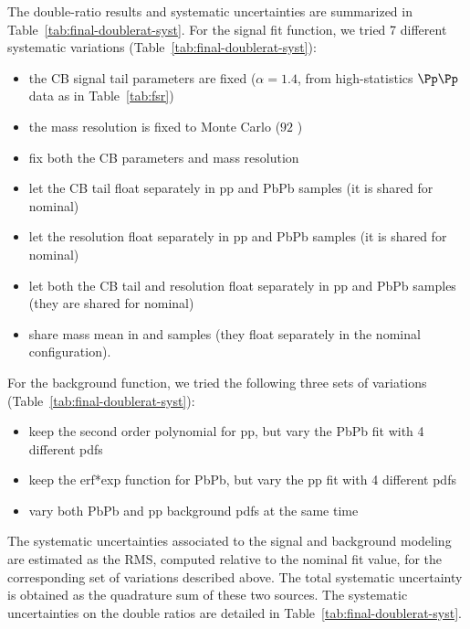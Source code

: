 The double-ratio results and systematic uncertainties are summarized in Table~\ref{tab:final-doublerat-syst}.
For the signal fit function, we tried 7 different systematic variations (Table~\ref{tab:final-doublerat-syst}): 
\begin{itemize}
\item the CB signal tail parameters are fixed ($\alpha=1.4$, from high-statistics $\Pp\Pp$ data as in Table~\ref{tab:fsr})
\item the \PgUa mass resolution is fixed to Monte Carlo ($92$ \MeV)
\item fix both the CB parameters and mass resolution
\item let the CB tail float separately in pp and PbPb samples (it is shared for nominal)
\item let the resolution float separately in pp and PbPb samples (it is shared for nominal)
\item let both the CB tail and resolution float separately in pp and PbPb samples (they are shared for nominal)
\item share \PgUa mass mean in \pp and \PbPb samples (they float separately in the nominal configuration).
\end{itemize}

For the background function, we tried the following three sets of variations (Table~\ref{tab:final-doublerat-syst}):
\begin{itemize}
\item keep the second order polynomial for pp, but vary the PbPb fit with 4 different pdfs
\item keep the erf*exp function for PbPb, but vary the pp fit with 4 different pdfs
\item vary both PbPb and pp background pdfs at the same time
\end{itemize}

The systematic uncertainties associated to the signal and background modeling are estimated as the RMS, computed relative to the nominal fit value, for the corresponding set of variations described above. The total systematic uncertainty is obtained as the quadrature sum of these two sources. 
The systematic uncertainties on the double ratios are detailed in Table~\ref{tab:final-doublerat-syst}. 

